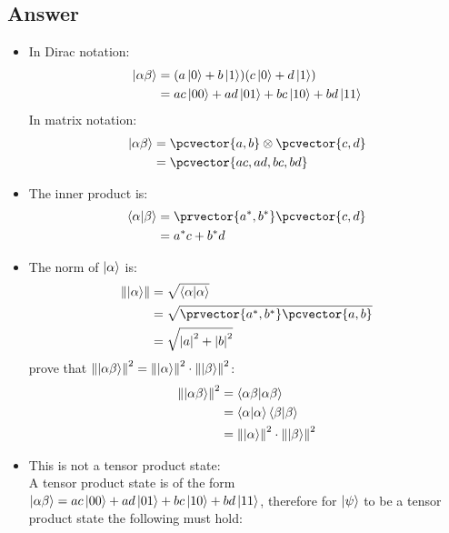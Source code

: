 \subsection*{Answer}
\begin{itemize}
    \item[a)] In Dirac notation:
        \begin{align*}
            \ket{\alpha\beta}
            &= (a\ket{0}+b\ket{1})(c\ket{0}+d\ket{1})\\
            &= ac\ket{00} + ad\ket{01} + bc\ket{10} + bd\ket{11}
        \end{align*}
        In matrix notation:
        \begin{align*}
            \ket{\alpha\beta}
            &= \pcvector{a,b}\tensor\pcvector{c,d}\\
            &= \pcvector{ac,ad,bc,bd}
        \end{align*}
    \item[b)] The inner product is:
        \begin{align*}
            \braket{\alpha}{\beta}
            &= \prvector{a^*,b^*}\pcvector{c,d}\\
            &= a^*c+b^*d
        \end{align*}
    \item[c)] The norm of $\ket{\alpha}$ is:
        \begin{align*}
            \norm{\ket{\alpha}}
            &= \sqrt{\braket{\alpha}}\\
            &= \sqrt{\prvector{a^*,b^*}\pcvector{a,b}}\\
            &= \sqrt{\abs{a}^2 + \abs{b}^2}
        \end{align*}
        prove that $\norm{\ket{\alpha\beta}}^2 = \norm{\ket{\alpha}}^2\cdot\norm{\ket{\beta}}^2$:
        \begin{align*}
            \norm{\ket{\alpha\beta}}^2
            &= \braket{\alpha\beta}\\
            &= \braket{\alpha}\braket{\beta}\\
            &= \norm{\ket{\alpha}}^2\cdot\norm{\ket{\beta}}^2
        \end{align*}
    \item[d)] This is not a tensor product state:\\
        A tensor product state is of the form $\ket{\alpha\beta} = ac\ket{00} + ad\ket{01} + bc\ket{10} + bd\ket{11}$, therefore for $\ket{\psi}$ to be a tensor product state the following must hold:
        \begin{equation*}

\end{equation*}
\end{itemize}
